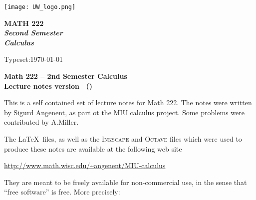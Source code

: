 \null
\texttt{[image: UW\_logo.png]}
\vfill


\begin{flushright}
  \Huge\bfseries\sffamily%
  MATH 222 \\
  \rmfamily
  \mdseries\itshape Second Semester \\
  Calculus\\[1in]
  \large \semester
\end{flushright}

\vfill
\begin{flushright}
\textsf{Typeset:\today}
\end{flushright}

\newpage
\begin{center}
  \bfseries\sffamily Math 222 -- 2nd Semester Calculus \\
  Lecture notes version \version\ (\semester)
\end{center}

\noindent This is a self contained set of lecture notes for Math 222. The
notes were written by Sigurd Angenent, as part ot the MIU calculus project.
Some problems were contributed by A.Miller.


The \LaTeX\ files, as well as the \textsc{Inkscape} and \textsc{Octave} files
which were used to produce these notes are available at the following web
site
\begin{center}
\url{http://www.math.wisc.edu/~angenent/MIU-calculus}
\end{center}
They are meant to be freely available for non-commercial use, in the sense
that ``free software'' is free. More precisely:

\bigskip

\begin{center}
\end{center}


